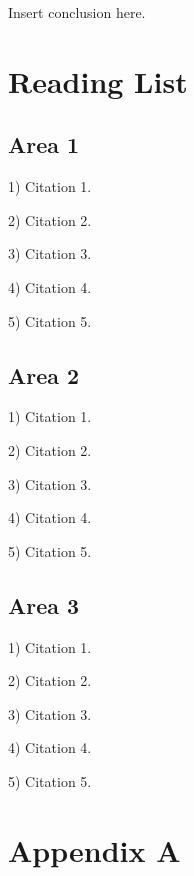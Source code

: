 \documentclass{article}
\begin{document}
Insert conclusion here.

\newpage

\appendix
\section{Reading List}
\label{app:readinglist}

\subsection{Area 1}

1) Citation 1.

2) Citation 2.

3) Citation 3.

4) Citation 4.

5) Citation 5.


\subsection{Area 2}

1) Citation 1.

2) Citation 2.

3) Citation 3.

4) Citation 4.

5) Citation 5.


\subsection{Area 3}

1) Citation 1.

2) Citation 2.

3) Citation 3.

4) Citation 4.

5) Citation 5.



\newpage

\section{Appendix A}
\label{app:cvtdp2r}


\newpage



\end{document}
